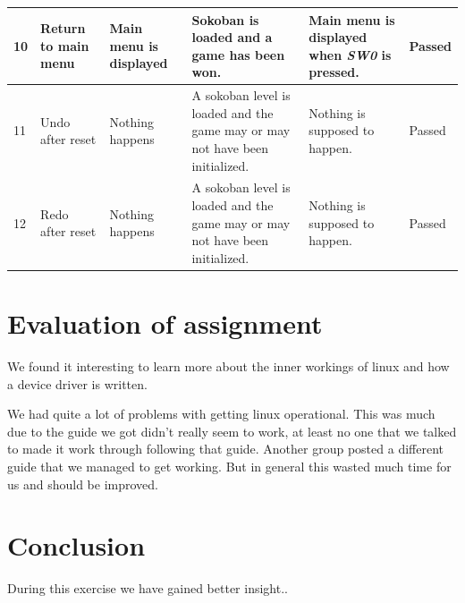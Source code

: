 \documentclass[a4paper,11pt]{article}
\begin{document}
\begin{center}
\begin{tabular}[pos]{|m{35pt}|m{45pt}|m{80pt}|m{90pt}|m{105pt}|m{40pt}|}
\hline 10 & Return to main menu & Main menu is displayed & Sokoban is loaded and a game has been won. & Main menu is displayed when \emph{SW0} is pressed.  & Passed \\

\hline 11 & Undo after reset & Nothing happens & A sokoban level is loaded and the game may or may not have been initialized. & Nothing is supposed to happen.  & Passed \\

\hline 12 & Redo after reset & Nothing happens & A sokoban level is loaded and the game may or may not have been initialized. & Nothing is supposed to happen.  & Passed \\

\hline 
\end{tabular} 
\end{center}

\newpage


\section{Evaluation of assignment}
We found it interesting to learn more about the inner workings of linux and how a device driver is written. 

We had quite a lot of problems with getting linux operational. This was much due to the guide we got didn't really seem to work, at least no one that we talked to made it work through following that guide. Another group posted a different guide that we managed to get working. But in general this wasted much time for us and should be improved. 

\section{Conclusion}
During this exercise we have gained better insight..
\end{document}

